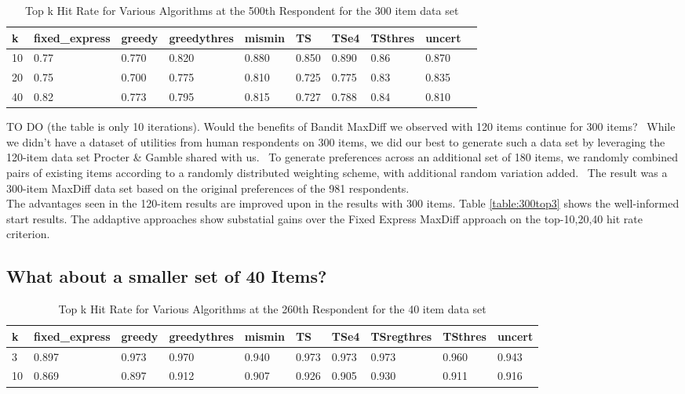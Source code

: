 \documentclass[nonblindrev]{informs3}
\begin{document}
\begin{table}
\begin{center}
\begin{tabular}{llllllllll}
\hline   k &  fixed\_express &  greedy &  greedythres &  mismin &    TS &  TSe4 &  TSthres &  uncert \\\hline   10 &           0.77 &   0.770 &        0.820 &   0.880 & 0.850 & 0.890 &     0.86 &   0.870 \\  20 &           0.75 &   0.700 &        0.775 &   0.810 & 0.725 & 0.775 &     0.83 &   0.835 \\  40 &           0.82 &   0.773 &        0.795 &   0.815 & 0.727 & 0.788 &     0.84 &   0.810 \\\end{tabular}
\end{center}
\caption{Top k Hit Rate for Various Algorithms at the 500th Respondent for the 300 item data set}
\label{table:300at500}
\end{table}
TO DO (the table is only 10 iterations).
Would the benefits of Bandit MaxDiff we observed with 120 items continue for 300 items?  While we didn't have a dataset of utilities from human respondents on 300 items, we did our best to generate such a data set by leveraging the 120-item data set Procter \& Gamble shared with us.  To generate preferences across an additional set of 180 items, we randomly combined pairs of existing items according to a randomly distributed weighting scheme, with additional random variation added.  The result was a 300-item MaxDiff data set based on the original preferences of the 981 respondents.\\
The advantages seen in the 120-item results are improved upon in the results with 300 items. Table \ref{table:300top3} shows the well-informed start results. The addaptive approaches show substatial gains over the Fixed Express MaxDiff approach on the top-10,20,40 hit rate criterion.\\
\subsection{What about a smaller set of 40 Items?}
\begin{table}
\begin{center}
\begin{tabular}{llllllllll}
\hline   k &  fixed\_express &  greedy &  greedythres &  mismin &    TS &  TSe4 &  TSregthres &  TSthres &  uncert  \\ \hline    3 &          0.897 &   0.973 &        0.970 &   0.940 & 0.973 & 0.973 &       0.973 &    0.960 &   0.943 \\  10 &          0.869 &   0.897 &        0.912 &   0.907 & 0.926 & 0.905 &       0.930 &    0.911 &   0.916  \end{tabular}
\end{center}
\caption{Top k Hit Rate for Various Algorithms at the 260th Respondent for the 40 item data set}
\label{table:40at260}
\end{table}
\end{document}
